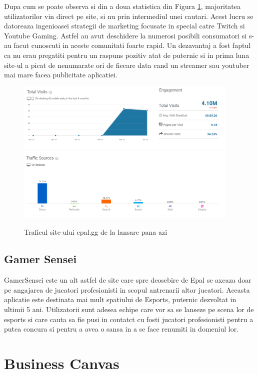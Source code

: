 \documentclass{article}
\begin{document}
Dupa cum se poate observa si din a doua statistica din Figura \ref{fig:epal-stat-1}, majoritatea utilizatorilor vin direct pe site, si nu prin intermediul unei cautari. Acest lucru se datoreaza ingenioasei strategii de marketing focusate in special catre Twitch si Youtube Gaming. Astfel au avut deschidere la numerosi posibili consumatori si s-au facut cunoscuti in aceste comunitati foarte rapid. Un dezavantaj a fost faptul ca nu erau pregatiti pentru un raspuns pozitiv atat de puternic si in prima luna site-ul a picat de nenumarate ori de fiecare data cand un streamer sau youtuber mai mare facea publicitate aplicatiei.
\begin{figure}[ht]
\centering
\includegraphics[width=0.95\textwidth]{img/epal-stat-1.png}
\includegraphics[width=0.95\textwidth]{img/epal-stat-2.png}
\caption{Traficul site-ului epal.gg de la lansare pana azi\cite{epalstats}} 
\label{fig:epal-stat-1}
\end{figure}

\subsection{Gamer Sensei}
GamerSensei\cite{gamersensei} este un alt astfel de site care spre deosebire de Epal se axeaza doar pe angajarea de jucatori profesionisti in scopul antrenarii altor jucatori. Aceasta aplicatie este destinata mai mult spatiului de Esports, puternic dezvoltat in ultimii 5 ani. Utilizatorii sunt adesea echipe care vor sa se lanseze pe scena lor de esports si care cauta sa fie pusi in contatct cu fosti jucatori profesionisti pentru a putea concura si pentru a avea o sansa in a se face renumiti in domeniul lor.
\section{Business Canvas}
\end{document}
